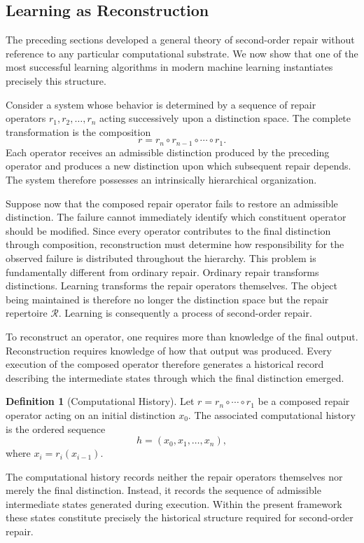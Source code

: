 \documentclass[12pt,oneside]{article}
\theoremstyle{plain}
\theoremstyle{definition}
\newtheorem{definition}[theorem]{Definition}
\theoremstyle{remark}
\theoremstyle{plain}
\begin{document}
\subsection{Learning as Reconstruction}

The preceding sections developed a general theory of second-order repair without reference to any
particular computational substrate. We now show that one of the most successful learning algorithms
in modern machine learning instantiates precisely this structure.

Consider a system whose behavior is determined by a sequence of repair operators $r_1, r_2, \ldots,
r_n$ acting successively upon a distinction space. The complete transformation is the composition
\[
r = r_n \circ r_{n-1} \circ \cdots \circ r_1.
\]
Each operator receives an admissible distinction produced by the preceding operator and produces a
new distinction upon which subsequent repair depends. The system therefore possesses an intrinsically
hierarchical organization.

Suppose now that the composed repair operator fails to restore an admissible distinction. The
failure cannot immediately identify which constituent operator should be modified. Since every
operator contributes to the final distinction through composition, reconstruction must determine
how responsibility for the observed failure is distributed throughout the hierarchy. This problem
is fundamentally different from ordinary repair. Ordinary repair transforms distinctions. Learning
transforms the repair operators themselves. The object being maintained is therefore no longer the
distinction space but the repair repertoire $\mathcal{R}$. Learning is consequently a process of
second-order repair.

To reconstruct an operator, one requires more than knowledge of the final output. Reconstruction
requires knowledge of how that output was produced. Every execution of the composed operator
therefore generates a historical record describing the intermediate states through which the final
distinction emerged.

\begin{definition}[Computational History]
Let $r = r_n \circ \cdots \circ r_1$ be a composed repair operator acting on an initial
distinction $x_0$. The associated computational history is the ordered sequence
\[
h = (x_0, x_1, \ldots, x_n),
\]
where $x_i = r_i(x_{i-1})$.
\end{definition}

The computational history records neither the repair operators themselves nor merely the final
distinction. Instead, it records the sequence of admissible intermediate states generated during
execution. Within the present framework these states constitute precisely the historical structure
required for second-order repair.
\end{document}
